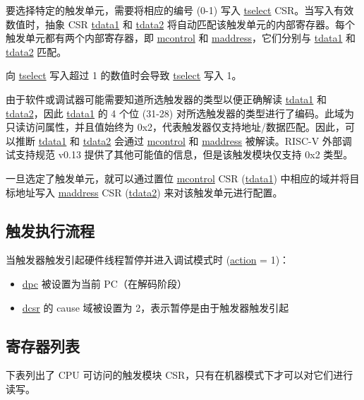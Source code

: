 \documentclass[main\_\_CN.tex]{subfiles}
\begin{document}
要选择特定的触发单元，需要将相应的编号 (0-1) 写入 \hyperref[regdesc:LPTSELECT]{tselect} CSR。当写入有效数值时，抽象 CSR \hyperref[regdesc:LPTDATA1]{tdata1} 和 \hyperref[regdesc:LPTDATA2]{tdata2} 将自动匹配该触发单元的内部寄存器。每个触发单元都有两个内部寄存器，即 \hyperref[regdesc:LPMCONTROL]{mcontrol} 和 \hyperref[regdesc:LPMADDRESS]{maddress}，它们分别与 \hyperref[regdesc:LPTDATA1]{tdata1} 和 \hyperref[regdesc:LPTDATA2]{tdata2} 匹配。

向 \hyperref[regdesc:LPTSELECT]{tselect} 写入超过 1 的数值时会导致 \hyperref[regdesc:LPTSELECT]{tselect} 写入 1。

由于软件或调试器可能需要知道所选触发器的类型以便正确解读 \hyperref[regdesc:LPTDATA1]{tdata1} 和 \hyperref[regdesc:LPTDATA2]{tdata2}，因此 \hyperref[regdesc:LPTDATA1]{tdata1} 的 4 个位 (31-28) 对所选触发器的类型进行了编码。此域为只读访问属性，并且值始终为 0x2，代表触发器仅支持地址/数据匹配。因此，可以推断 \hyperref[regdesc:LPTDATA1]{tdata1} 和 \hyperref[regdesc:LPTDATA2]{tdata2} 会通过 \hyperref[regdesc:LPMCONTROL]{mcontrol} 和 \hyperref[regdesc:LPMADDRESS]{maddress} 被解读。RISC-V 外部调试支持规范 v0.13 提供了其他可能值的信息，但是该触发模块仅支持 0x2 类型。

一旦选定了触发单元，就可以通过置位  \hyperref[regdesc:LPMCONTROL]{mcontrol} CSR (\hyperref[regdesc:LPTDATA1]{tdata1}) 中相应的域并将目标地址写入 \hyperref[regdesc:LPMADDRESS]{maddress} CSR (\hyperref[regdesc:LPTDATA2]{tdata2}) 来对该触发单元进行配置。


\subsection{触发执行流程}
\label{sec:ulp-hwt-suggest-op}

当触发器触发引起硬件线程暂停并进入调试模式时 (\hyperref[fielddesc:LPMCONTROLACTION]{action} = 1)：
\begin{itemize}
    \item \hyperref[regdesc:LPDPC]{dpc} 被设置为当前 PC（在解码阶段）
    \item \hyperref[regdesc:LPDCSR]{dcsr} 的 cause 域被设置为 2，表示暂停是由于触发器触发引起
\end{itemize}


\subsection{寄存器列表}\label{sec:ulp-hwt-reg-sum}
下表列出了 CPU 可访问的触发模块 CSR，只有在机器模式下才可以对它们进行读写。
\end{document}
